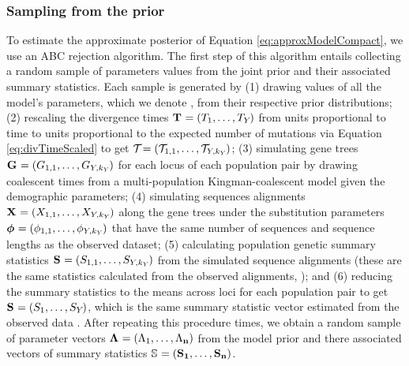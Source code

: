 \documentclass[letterpaper,12pt]{article}
\begin{document}
\begin{linenumbers}
\subsubsection*{Sampling from the prior}
To estimate the approximate posterior of Equation \ref{eq:approxModelCompact},
we use an ABC rejection algorithm.
The first step of this algorithm entails collecting a random sample of
parameters values from the joint prior and their associated summary
statistics.
Each sample is generated by
(1) drawing values of all the model's parameters, which we denote \hpvector{},
from their respective prior distributions;
(2) rescaling the divergence times
$\mathbf{T_{}} = (T_{1}, \ldots, T_{Y_{}})$
from units proportional to time to units proportional to the expected number
of mutations via Equation \ref{eq:divTimeScaled} to get 
$\divTimeScaledVector = (\divTimeScaled{1}{1}, \ldots,
\divTimeScaled{\npairs{}}{\nloci{\npairs{}}})$;
(3) simulating gene trees $\geneTreeVector = (\geneTree{1}{1}, \ldots, 
\geneTree{\npairs{}}{\nloci{\npairs{}}})$
for each locus of each population pair by drawing coalescent times from
a multi-population Kingman-coalescent model given the demographic parameters;
(4) simulating sequences alignments 
$\alignmentVector = (\alignment{1}{1}, \ldots, \alignment{\npairs{}}{\nloci{\npairs{}}})$
along the gene trees under the
\hky substitution parameters
$\hkyModelVector = (\hkyModel{1}{1}, \ldots, \hkyModel{\npairs{}}{\nloci{\npairs{}}})$
that have the same number of sequences and sequence lengths as the observed
dataset;
(5) calculating population genetic summary statistics
$\ssVector{} = (\alignmentSS{1}{1}, \ldots, \alignmentSS{\npairs{}}{\nloci{\npairs{}}})$
from the simulated sequence alignments (these are the same statistics
calculated from the observed alignments, \ssVectorObs{});
and (6) reducing the summary statistics to the means across loci for each
population pair to get
$\ssVector{} = (\alignmentSS{1}{}, \ldots, \alignmentSS{\npairs{}}{})$, which is
the same summary statistic vector estimated from the observed data \ssVectorObs.
After repeating this procedure \numPriorSamples times, we obtain a random
sample of parameter vectors
$\boldsymbol{\Lambda_{}} = (\Lambda_{1}, \ldots, \Lambda_{\mathbf{n}})$
from the model prior and there associated vectors of summary statistics
$\ssMatrix = (\ssVector{1}, \ldots, \ssVector{\numPriorSamples})$.


\end{linenumbers}
\end{document}
